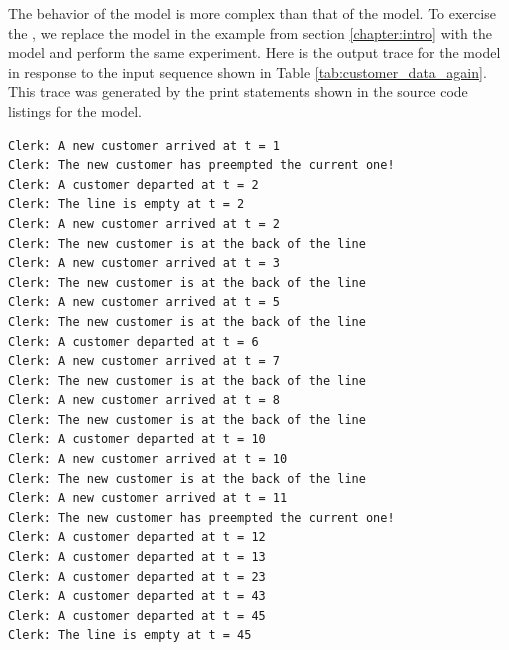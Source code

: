 The behavior of the  model is more complex than that of the  model. To exercise the , we replace the  model in the example from section \ref{chapter:intro} with the  model and perform the same experiment. Here is the output trace for the  model in response to the input sequence shown in Table \ref{tab:customer_data_again}. This trace was generated by the print statements shown in the source code listings for the  model.
\begin{verbatim}
Clerk: A new customer arrived at t = 1
Clerk: The new customer has preempted the current one!
Clerk: A customer departed at t = 2
Clerk: The line is empty at t = 2
Clerk: A new customer arrived at t = 2
Clerk: The new customer is at the back of the line
Clerk: A new customer arrived at t = 3
Clerk: The new customer is at the back of the line
Clerk: A new customer arrived at t = 5
Clerk: The new customer is at the back of the line
Clerk: A customer departed at t = 6
Clerk: A new customer arrived at t = 7
Clerk: The new customer is at the back of the line
Clerk: A new customer arrived at t = 8
Clerk: The new customer is at the back of the line
Clerk: A customer departed at t = 10
Clerk: A new customer arrived at t = 10
Clerk: The new customer is at the back of the line
Clerk: A new customer arrived at t = 11
Clerk: The new customer has preempted the current one!
Clerk: A customer departed at t = 12
Clerk: A customer departed at t = 13
Clerk: A customer departed at t = 23
Clerk: A customer departed at t = 43
Clerk: A customer departed at t = 45
Clerk: The line is empty at t = 45
\end{verbatim}

